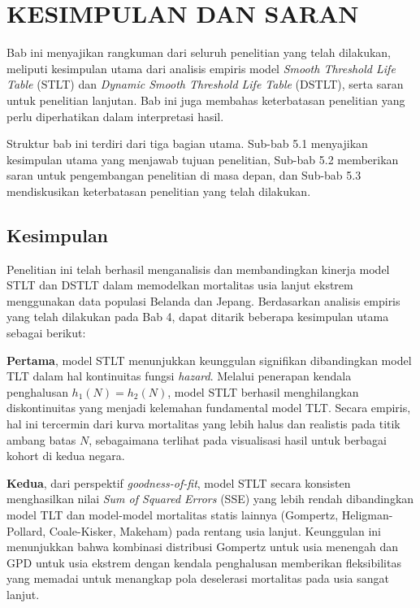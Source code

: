 \chapter{KESIMPULAN DAN SARAN}

Bab ini menyajikan rangkuman dari seluruh penelitian yang telah dilakukan, meliputi kesimpulan utama dari analisis empiris model \textit{Smooth Threshold Life Table} (STLT) dan \textit{Dynamic Smooth Threshold Life Table} (DSTLT), serta saran untuk penelitian lanjutan. Bab ini juga membahas keterbatasan penelitian yang perlu diperhatikan dalam interpretasi hasil.

Struktur bab ini terdiri dari tiga bagian utama. Sub-bab 5.1 menyajikan kesimpulan utama yang menjawab tujuan penelitian, Sub-bab 5.2 memberikan saran untuk pengembangan penelitian di masa depan, dan Sub-bab 5.3 mendiskusikan keterbatasan penelitian yang telah dilakukan.

\section{Kesimpulan}

Penelitian ini telah berhasil menganalisis dan membandingkan kinerja model STLT dan DSTLT dalam memodelkan mortalitas usia lanjut ekstrem menggunakan data populasi Belanda dan Jepang. Berdasarkan analisis empiris yang telah dilakukan pada Bab 4, dapat ditarik beberapa kesimpulan utama sebagai berikut:

\textbf{Pertama}, model STLT menunjukkan keunggulan signifikan dibandingkan model TLT dalam hal kontinuitas fungsi \textit{hazard}. Melalui penerapan kendala penghalusan $h_1(N) = h_2(N)$, model STLT berhasil menghilangkan diskontinuitas yang menjadi kelemahan fundamental model TLT. Secara empiris, hal ini tercermin dari kurva mortalitas yang lebih halus dan realistis pada titik ambang batas $N$, sebagaimana terlihat pada visualisasi hasil untuk berbagai kohort di kedua negara.

\textbf{Kedua}, dari perspektif \textit{goodness-of-fit}, model STLT secara konsisten menghasilkan nilai \textit{Sum of Squared Errors} (SSE) yang lebih rendah dibandingkan model TLT dan model-model mortalitas statis lainnya (Gompertz, Heligman-Pollard, Coale-Kisker, Makeham) pada rentang usia lanjut. Keunggulan ini menunjukkan bahwa kombinasi distribusi Gompertz untuk usia menengah dan GPD untuk usia ekstrem dengan kendala penghalusan memberikan fleksibilitas yang memadai untuk menangkap pola deselerasi mortalitas pada usia sangat lanjut.

